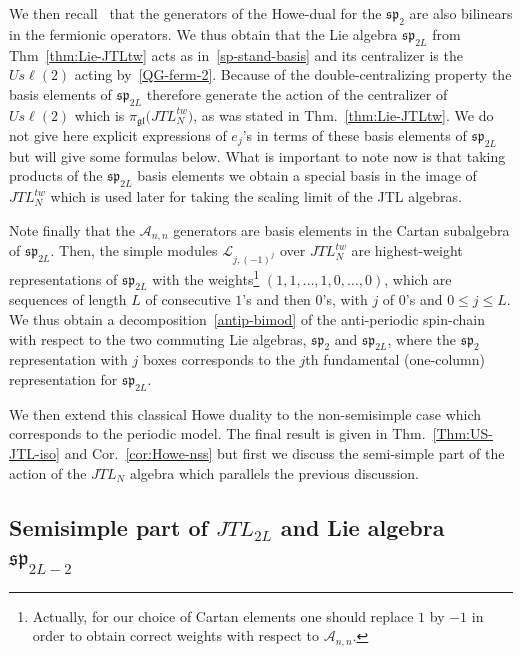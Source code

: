 \documentclass[11pt]{article}
\newcommand{\JTL}[1]{JTL_{#1}}
\newcommand{\Asp}{\mathcal{A}}
\newcommand{\gl}{\mathfrak{gl}}
\newcommand{\ssp}{\mathfrak{sp}}
\newcommand{\repgl}{\pi_{\gl}}
\newcommand{\AIrrTL}[2]{\mathscr{L}_{#1,#2}}
\theoremstyle{definition}
\begin{document}
We then recall~\cite{H3} that the generators of the Howe-dual for the $\ssp_{2}$ are also bilinears in the fermionic operators.
We thus obtain that the Lie algebra $\ssp_{2L}$ from Thm~\ref{thm:Lie-JTLtw} acts as in~\eqref{sp-stand-basis} and its centralizer is the $U s\ell(2)$ acting by~\eqref{QG-ferm-2}. Because of the double-centralizing property the basis elements  of $\ssp_{2L}$ therefore
generate
the action of the centralizer of $U s\ell(2)$ which is $\repgl\bigl(\JTL{N}^{tw}\bigr)$,
as was stated in Thm.~\ref{thm:Lie-JTLtw}. We do not give here explicit expressions of $e_j$'s in terms of these basis elements of $\ssp_{2L}$ but will give some formulas below. What is important to note now is  that taking products of the $\ssp_{2L}$ basis elements we obtain a special basis in the image of $\JTL{N}^{tw}$ which is used later for taking the scaling limit of the JTL algebras.

Note finally that the  $\Asp_{n,n}$ generators are basis elements in the Cartan subalgebra of $\ssp_{2L}$. Then, the simple modules  $\AIrrTL{j}{(-1)^{j}}$ over
$\JTL{N}^{tw}$ are  highest-weight
representations of  $\ssp_{2L}$ with the weights\footnote{Actually, for our choice of Cartan elements one should replace $1$ by $-1$ in order to obtain correct weights with respect to $\Asp_{n,n}$.} $(1,1,\dots,1,0,\dots,0)$, which are  sequences of length $L$ of consecutive $1$'s and then $0$'s,  with $j$ of $0$'s and $0\leq j\leq L$. We thus obtain a decomposition~\eqref{antip-bimod} of the anti-periodic spin-chain with respect to the two commuting Lie algebras, $\ssp_2$ and $\ssp_{2L}$, where the $\ssp_2$ representation with $j$ boxes corresponds to the $j$th fundamental  (one-column) representation for $\ssp_{2L}$.


We then extend this classical Howe duality to the non-semisimple case which corresponds to the periodic model. The final result is given in Thm.~\ref{Thm:US-JTL-iso} and Cor.~\ref{cor:Howe-nss} but first we discuss the semi-simple part of the action of the $\JTL{N}$ algebra which parallels the previous discussion.

\subsection{Semisimple part of $\JTL{2L}$ and Lie algebra $\ssp_{2L-2}$ }\label{Howe-ss}
\end{document}
